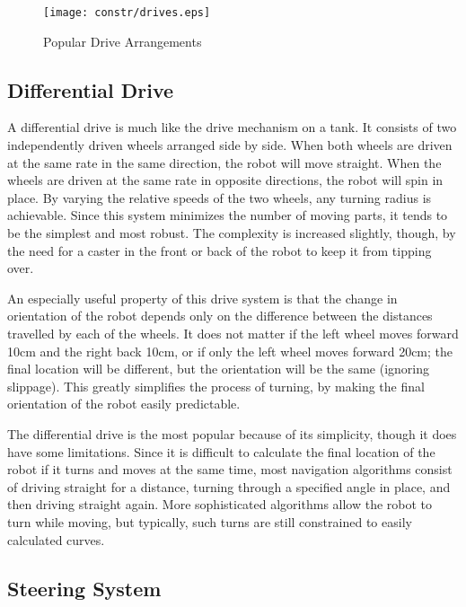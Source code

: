 \begin{figure}[htbp]
\begin{center}
\texttt{[image: constr/drives.eps]}
\caption{Popular Drive Arrangements}
\label{drives}
\end{center}
\end{figure}

\subsection{Differential Drive}

A differential drive is much like the drive mechanism on a tank.  It consists of two independently driven wheels arranged side by side.  When both wheels are driven at the same rate in the same direction, the robot will move straight.  When the wheels are driven at the same rate in opposite directions, the robot will spin in place.  By varying the relative speeds of the two wheels, any turning radius is achievable.  Since this system minimizes the number of moving parts, it tends to be the simplest and most robust.  The complexity is increased slightly, though, by the need for a caster in the front or back of the robot to keep it from tipping over.

An especially useful property of this drive system is that the change in orientation of the robot depends only on the difference between the distances travelled by each of the wheels.  It does not matter if the left wheel moves forward 10cm and the right back 10cm, or if only the left wheel moves forward 20cm; the final location will be different, but the orientation will be the same (ignoring slippage).  This greatly simplifies the process of turning, by making the final orientation of the robot easily predictable.

The differential drive is the most popular because of its simplicity, though it does have some limitations.  Since it is difficult to calculate the final location of the robot if it turns and moves at the same time, most navigation algorithms consist of driving straight for a distance, turning through a specified angle in place, and then driving straight again. More sophisticated algorithms allow the robot to turn while moving, but typically, such turns are still constrained to easily calculated curves.

\subsection{Steering System}

